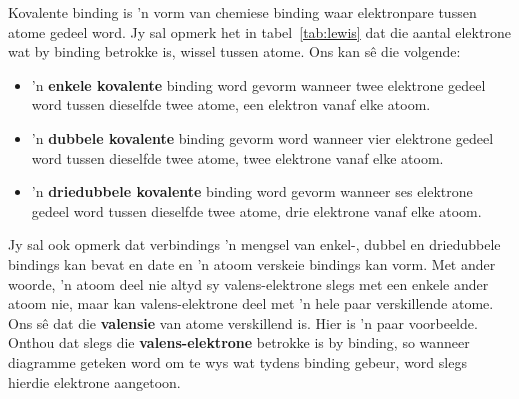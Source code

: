 
\label{m38704*fhsst!!!underscore!!!id94}
 {Kovalente binding is  'n vorm van chemiese binding waar elektronpare tussen atome gedeel word.} 
\label{m38704*id139505}Jy sal opmerk het in tabel~\ref{tab:lewis} dat die aantal elektrone wat by binding betrokke is, wissel tussen atome. Ons kan s\^{e} die volgende:
\begin{itemize}
 \item  'n \textbf{enkele kovalente} binding word gevorm wanneer twee elektrone gedeel word tussen dieselfde twee atome, een elektron vanaf elke atoom. 
 \item  'n \textbf{dubbele kovalente} binding gevorm word wanneer vier elektrone gedeel word tussen dieselfde twee atome, twee elektrone vanaf elke atoom.
 \item  'n \textbf{driedubbele kovalente} binding word gevorm wanneer ses elektrone gedeel word tussen dieselfde twee atome, drie elektrone vanaf elke atoom.
\end{itemize}
Jy sal ook opmerk dat verbindings  'n mengsel van enkel-, dubbel en driedubbele bindings kan bevat en date en   'n atoom verskeie bindings kan vorm. Met ander woorde,  'n atoom deel nie altyd sy valens-elektrone slegs met een enkele ander atoom nie, maar kan valens-elektrone deel met   'n hele paar verskillende atome.\\
Ons s\^{e} dat die \textbf{valensie} van atome verskillend is. 
\label{m38704*id138991}Hier is  'n paar voorbeelde. Onthou dat slegs die \textbf{valens-elektrone} betrokke is by binding, so wanneer diagramme geteken word om te wys wat tydens binding gebeur, word slegs hierdie elektrone aangetoon. \par 
\label{m38704*secfhsst!!!underscore!!!id98} 

